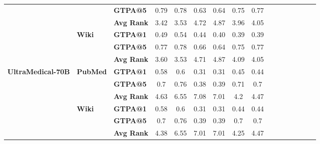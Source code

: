 \begin{table}[t]
{\begin{tabular}{lllccccccccccccc}
    & & \textbf{GTPA@5} & 0.79 & 0.78 & 0.63 & 0.64 & 0.75 & 0.77 \\
    & & \textbf{Avg Rank} & 3.42 & 3.53 & 4.72 & 4.87 & 3.96 & 4.05 \\
    \cmidrule{2-9}
    & \multirow{2}{*}{\textbf{Wiki}} 
    & \textbf{GTPA@1} & 0.49 & 0.54 & 0.44 & 0.40 & 0.39 & 0.39 \\
    & & \textbf{GTPA@5} & 0.77 & 0.78 & 0.66 & 0.64 & 0.75 & 0.77 \\
    & & \textbf{Avg Rank} & 3.60 & 3.53 & 4.71 & 4.87 & 4.09 & 4.05 \\
    \midrule
    \multirow{4}{*}{\textbf{UltraMedical-70B}} 
    & \multirow{2}{*}{\textbf{PubMed}} 
    & \textbf{GTPA@1} & 0.58 & 0.6 & 0.31 & 0.31 & 0.45 & 0.44 \\
    & & \textbf{GTPA@5} & 0.7 & 0.76 & 0.38 & 0.39 & 0.71 & 0.7 \\
    & & \textbf{Avg Rank} & 4.63 & 6.55 & 7.08 & 7.01 & 4.2 & 4.47 \\
    \cmidrule{2-9}
    & \multirow{2}{*}{\textbf{Wiki}} 
    & \textbf{GTPA@1} & 0.58 & 0.6 & 0.31 & 0.31 & 0.44 & 0.44 \\
    & & \textbf{GTPA@5} & 0.7 & 0.76 & 0.39 & 0.39 & 0.7 & 0.7 \\
    & & \textbf{Avg Rank} & 4.38 & 6.55 & 7.01 & 7.01 & 4.25 & 4.47 \\

\end{tabular}}
\end{table}
